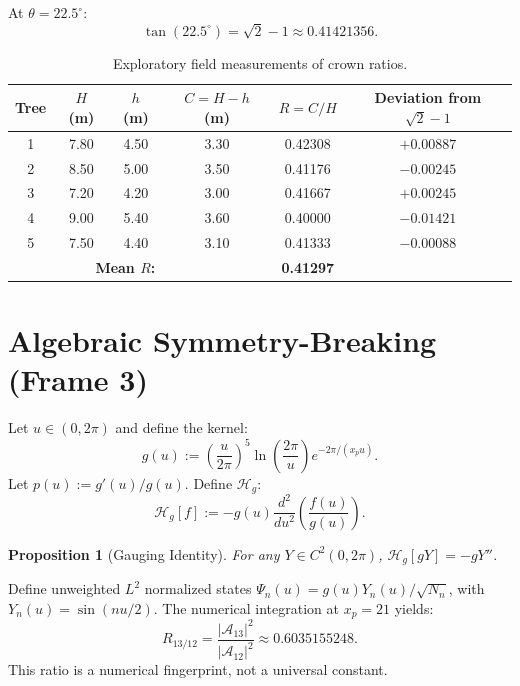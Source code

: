 \documentclass[12pt,a4paper]{article}
\newtheorem{proposition}{Proposition}
\begin{document}
At \(\theta = 22.5^\circ\):
\begin{equation}\label{eq:tan}
\tan(22.5^\circ) = \sqrt{2} - 1 \approx 0.41421356.
\end{equation}

\begin{table}[h!]
\centering
\caption{Exploratory field measurements of crown ratios.}
\begin{tabular}{cccccc}
\toprule
Tree & \(H\) (m) & \(h\) (m) & \(C=H-h\) (m) & \(R=C/H\) & Deviation from \(\sqrt{2}-1\)\\
\midrule
1 & 7.80 & 4.50 & 3.30 & 0.42308 & \(+0.00887\)\\
2 & 8.50 & 5.00 & 3.50 & 0.41176 & \(-0.00245\)\\
3 & 7.20 & 4.20 & 3.00 & 0.41667 & \(+0.00245\)\\
4 & 9.00 & 5.40 & 3.60 & 0.40000 & \(-0.01421\)\\
5 & 7.50 & 4.40 & 3.10 & 0.41333 & \(-0.00088\)\\
\midrule
\multicolumn{3}{r}{\textbf{Mean \(R\):}} & & \textbf{0.41297} & \\
\bottomrule
\end{tabular}
\end{table}

\section{Algebraic Symmetry-Breaking (Frame 3)}\label{sec:algebraic}

Let \(u \in (0, 2\pi)\) and define the kernel:
\begin{equation}\label{eq:g}
g(u) := \left(\frac{u}{2\pi}\right)^{5} \ln\!\left(\frac{2\pi}{u}\right) e^{-2\pi/(x_p u)}.
\end{equation}
Let \(p(u) := g'(u)/g(u)\). Define \(\mathcal{H}_g\):
\begin{equation}\label{eq:Hg}
\mathcal{H}_g[f] := -g(u)\frac{d^2}{du^2} \left(\frac{f(u)}{g(u)}\right).
\end{equation}

\begin{proposition}[Gauging Identity]
For any \(Y \in C^2(0, 2\pi)\), \(\mathcal{H}_g[gY] = -gY''\).
\end{proposition}

Define unweighted \(L^2\) normalized states \(\Psi_n(u) = g(u)Y_n(u)/\sqrt{N_n}\), with \(Y_n(u) = \sin(nu/2)\). The numerical integration at \(x_p=21\) yields:
\begin{equation}\label{eq:R}
R_{13/12} = \frac{|\mathcal{A}_{13}|^2}{|\mathcal{A}_{12}|^2} \approx 0.6035155248.
\end{equation}
This ratio is a numerical fingerprint, not a universal constant.
\end{document}
